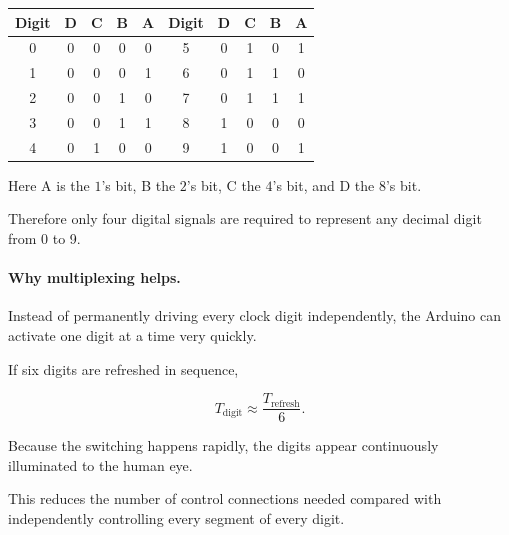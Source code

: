 \documentclass[12pt,letterpaper]{article}
\begin{document}
\begin{center}

\small

\begin{tabular}{
c|cccc@{\qquad}c|cccc
}

\toprule

Digit & D & C & B & A
&
Digit & D & C & B & A
\\

\midrule

0 & 0 & 0 & 0 & 0
&
5 & 0 & 1 & 0 & 1
\\

1 & 0 & 0 & 0 & 1
&
6 & 0 & 1 & 1 & 0
\\

2 & 0 & 0 & 1 & 0
&
7 & 0 & 1 & 1 & 1
\\

3 & 0 & 0 & 1 & 1
&
8 & 1 & 0 & 0 & 0
\\

4 & 0 & 1 & 0 & 0
&
9 & 1 & 0 & 0 & 1
\\

\bottomrule

\end{tabular}

\end{center}

Here A is the \(1\)'s bit,
B the \(2\)'s bit,
C the \(4\)'s bit,
and D the \(8\)'s bit.

Therefore only four digital signals are required
to represent any decimal digit from 0 to 9.

\paragraph{Why multiplexing helps.}

Instead of permanently driving every clock digit
independently, the Arduino can activate
one digit at a time very quickly.

If six digits are refreshed in sequence,

\[
T_{\text{digit}}
\approx
\frac{T_{\text{refresh}}}{6}.
\]

Because the switching happens rapidly,
the digits appear continuously illuminated
to the human eye.

This reduces the number of control connections
needed compared with independently controlling
every segment of every digit.

\end{document}
